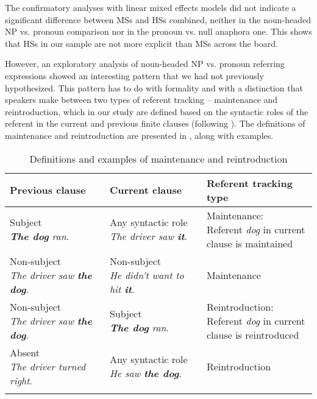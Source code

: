 \documentclass[output=paper,colorlinks,citecolor=brown]{langscibook}
\begin{document}
The confirmatory analyses with linear mixed effects models did not indicate a significant difference between MSs and HSs combined, neither in the noun-headed NP vs. pronoun comparison nor in the pronoun vs. null anaphora one. This shows that HSs in our sample are not more explicit than MSs across the board. 

However, an exploratory analysis of noun-headed NP vs. pronoun referring expressions showed an interesting pattern that we had not previously hypothesized. This pattern has to do with formality and with a distinction that speakers make between two types of referent tracking -- maintenance and reintroduction, which in our study are defined based on the syntactic roles of the referent in the current and previous finite clauses (following \cite{Hickmann1999, Serratrice2007, Perniss2015}). The definitions of maintenance and reintroduction are presented in , along with examples.

\begin{table}
\begin{tabularx}{\textwidth}{p{} p{} p{}}

\lsptoprule 
Previous clause & Current clause & Referent tracking type \\

\midrule 
\makecell[l]{Subject\\\textit{\textbf{The dog} ran}.} & 
\makecell[l]{Any syntactic role\\\textit{The driver saw \textbf{it}}.} & 
\makecell[l]{Maintenance:\\Referent \textit{dog} in current \\clause is maintained} \\\tablevspace

\makecell[l]{Non-subject\\\textit{The driver saw \textbf{the dog}}.} & 
\makecell[l]{Non-subject\\\textit{He didn't want to hit \textbf{it}}.} & 
Maintenance \\\tablevspace

\makecell[l]{Non-subject\\\textit{The driver saw \textbf{the dog}}.} & 
\makecell[l]{Subject\\\textit{\textbf{The dog} ran}.} & 
\makecell[l]{Reintroduction:\\Referent \textit{dog} in current \\clause is reintroduced} \\\tablevspace

\makecell[l]{Absent\\\textit{The driver turned right}.} & 
\makecell[l]{Any syntactic role\\\textit{He saw \textbf{the dog}}.} & 
Reintroduction \\
\lspbottomrule 
\end{tabularx}
\caption{Definitions and examples of maintenance and reintroduction}
\label{tab:pashkovaetal:maint}
\end{table}
\end{document}

